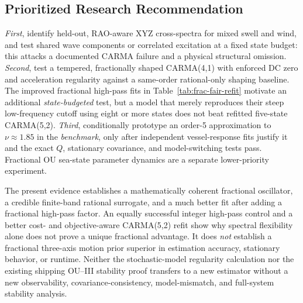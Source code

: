 \subsection{Prioritized Research Recommendation}
\label{sec:frac-recommendation}
\emph{First}, identify held-out, RAO-aware XYZ cross-spectra
for mixed swell and wind, and test shared wave components or
correlated excitation at a fixed state budget: this attacks a
documented CARMA failure and a physical structural omission.
\emph{Second}, test a tempered, fractionally shaped CARMA(4,1)
with enforced DC zero and acceleration regularity against
a same-order rational-only shaping baseline. The improved
fractional high-pass fits in Table~\ref{tab:frac-fair-refit}
motivate an additional \emph{state-budgeted} test, but a model
that merely reproduces their steep low-frequency cutoff using
eight or more states does not beat refitted five-state CARMA(5,2).
\emph{Third}, conditionally prototype an order-5
approximation to \(\nu\approx1.85\) in the \emph{benchmark},
only after independent vessel-response fits justify it and
the exact \(Q\), stationary covariance, and model-switching
tests pass. Fractional OU sea-state parameter dynamics are
a separate lower-priority experiment.

The present evidence establishes a mathematically coherent
fractional oscillator, a credible finite-band rational surrogate,
and a much better fit after adding a fractional high-pass factor.
An equally successful integer high-pass control and a better
cost- and objective-aware CARMA(5,2) refit show why spectral
flexibility alone does not prove a unique fractional advantage.
It does \emph{not} establish a fractional
three-axis motion prior superior in estimation accuracy,
stationary behavior, or runtime. Neither the stochastic-model
regularity calculation nor the existing shipping OU--III
stability proof transfers to a new estimator without a
new observability, covariance-consistency, model-mismatch,
and full-system stability analysis.
